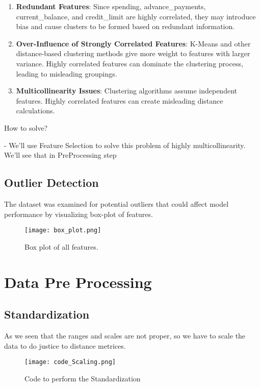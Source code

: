 \documentclass[12pt]{article}
\begin{document}
\begin{enumerate}
    \item \textbf{Redundant Features}: Since spending, advance\_payments, current\_balance, and credit\_limit are highly correlated, they may introduce bias and cause clusters to be formed based on redundant information.
    
    \item \textbf{Over-Influence of Strongly Correlated Features}: K-Means and other distance-based clustering methods give more weight to features with larger variance. Highly correlated features can dominate the clustering process, leading to misleading groupings.


    \item \textbf{Multicollinearity Issues}: Clustering algorithms assume independent features. Highly correlated features can create misleading distance calculations.
\end{enumerate}


How to solve?

- We'll use Feature Selection to solve this problem of highly multicollinearity. We'll see that in PreProcessing step


\subsection{Outlier Detection}

The dataset was examined for potential outliers that could affect model performance by visualizing box-plot of features.

\begin{figure}[h]
    \centering
    \texttt{[image: box\_plot.png]}
    \caption{Box plot of all features.}
    \label{fig:example}
\end{figure}


\section{Data Pre Processing}

\subsection{Standardization}

As we seen that the ranges and scales are not proper, so we have to scale the data to do justice to distance metrices.

\begin{figure}[h]
    \centering
    \texttt{[image: code\_Scaling.png]}
    \caption{Code to perform the Standardization}
    \label{fig:example}
\end{figure}
\end{document}
